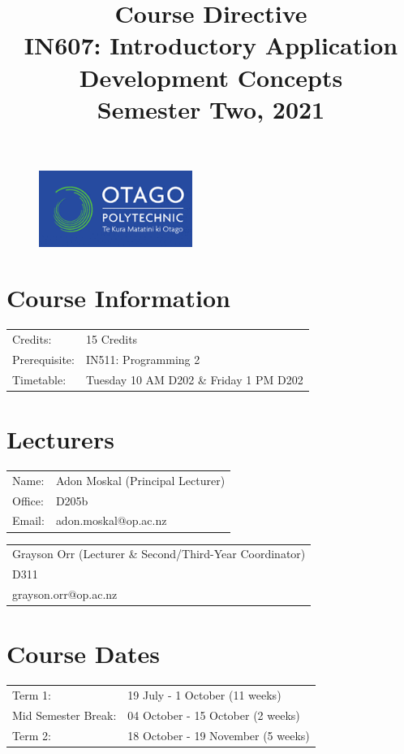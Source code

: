 \documentclass{article}
\author{}
\begin{document}
\begin{figure}
	\includegraphics[width=50mm]{../img/logo.png} 
\end{figure}

\title{Course Directive\\IN607: Introductory Application Development Concepts\\Semester Two, 2021}
\date{}
\maketitle

\section*{Course Information}
\begin{tabular}{ll}
	Credits:            & 15 Credits                             \\
	Prerequisite:       & IN511: Programming 2                   \\
	Timetable:  & Tuesday 10 AM D202 \& Friday 1 PM D202       
\end{tabular} 

\section*{Lecturers}
\begin{tabular}{ll}
	Name:   & Adon Moskal (Principal Lecturer) \\
	Office: & D205b                            \\
	Email:  & adon.moskal@op.ac.nz             \\
\end{tabular}
\begin{tabular}{l}
	Grayson Orr (Lecturer \& Second/Third-Year Coordinator) \\
	D311                   \\
	grayson.orr@op.ac.nz   \\
\end{tabular}

\section*{Course Dates}
\begin{tabular}{ll} 
	Term 1:             & 19 July - 1 October (11 weeks) \\
	Mid Semester Break: & 04 October - 15 October (2 weeks)    \\
	Term 2:             & 18 October - 19 November (5 weeks)          
\end{tabular}
\end{document}
